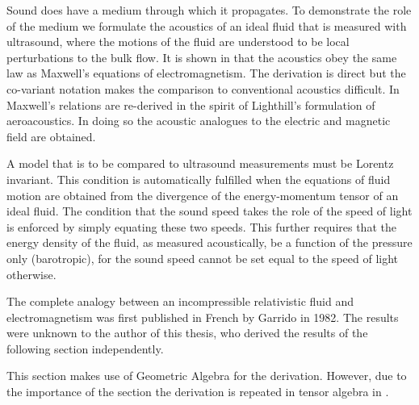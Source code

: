 Sound does have a medium through which it propagates.
To demonstrate the role of the medium we formulate the acoustics of  an ideal fluid that is measured with ultrasound,
where the motions of the fluid are  understood to be local perturbations to the bulk flow.
It is shown in  that the acoustics  obey the same law as Maxwell's equations of electromagnetism.
The derivation is direct but the co-variant notation makes the comparison to conventional acoustics difficult.
In  Maxwell's relations are re-derived in the spirit of Lighthill's formulation of aeroacoustics.
In doing so the acoustic analogues to the electric and magnetic field are obtained.

%
A model that is to be compared to ultrasound measurements must be  Lorentz invariant.
This condition is  automatically fulfilled  when the equations of fluid motion are obtained from the  divergence of the energy-momentum tensor of an ideal fluid.
The condition that the sound speed takes the role  of the speed of light
is enforced by simply equating these two speeds.
This further requires that the energy density of the fluid, as measured acoustically, be a function of the pressure only (barotropic),
for the sound speed cannot be set equal to the speed of light otherwise\cite{Taub1978}.

The complete analogy between an incompressible relativistic fluid and electromagnetism was first published in French by Garrido\cite{Garrido1982} in 1982.
The results were unknown to the author of this thesis, who derived the results of the following section independently.

This section makes use of Geometric Algebra\cite{Hestenes1984,Doran2003} for the derivation.
However, due to the importance of the section the derivation is repeated in tensor algebra in .

